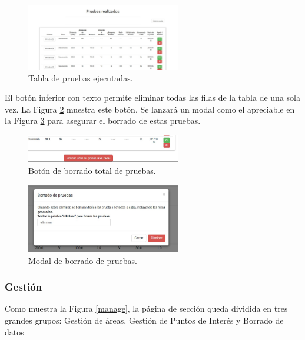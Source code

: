 \begin{figure}[h]
  \centering
    \includegraphics[width=0.6\textwidth]{../img/manualusuario/ejecuciones.jpg}
  \caption{Tabla de pruebas ejecutadas.}
  \label{ejecuciones}
\end{figure}

El botón inferior con texto  permite eliminar todas las filas de la tabla de una sola vez. La Figura \ref{borratodaspruebas} muestra este botón. Se lanzará un modal como el apreciable en la Figura \ref{borradopruebasmodal} para asegurar el borrado de estas pruebas.

\begin{figure}[h]
  \centering
    \includegraphics[width=0.6\textwidth]{../img/manualusuario/borratodaspruebas.jpg}
  \caption{Botón de borrado total de pruebas.}
  \label{borratodaspruebas}
\end{figure}

\begin{figure}[h]
  \centering
    \includegraphics[width=0.6\textwidth]{../img/manualusuario/borradopruebasmodal.jpg}
  \caption{Modal de borrado de pruebas.}
  \label{borradopruebasmodal}
\end{figure}

\subsubsection{Gestión}
Como muestra la Figura \ref{manage}, la página de sección queda dividida en tres grandes grupos: Gestión de áreas, Gestión de Puntos de Interés y Borrado de datos

